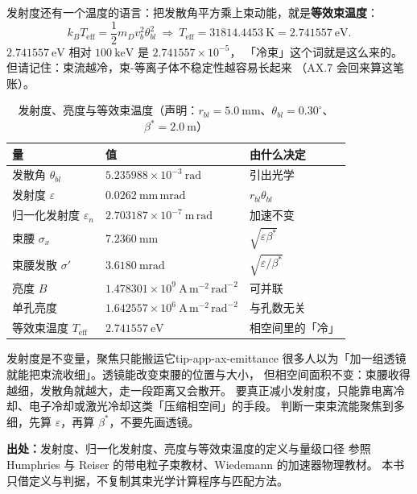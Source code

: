 发射度还有一个温度的语言：把发散角平方乘上束动能，就是\textbf{等效束温度}：
\begin{equation}
k_BT_\mathrm{eff}=\frac{1}{2}m_Dv_b^2\theta_{bl}^2
\ \Longrightarrow\
T_\mathrm{eff}=31814.4453\ \mathrm{K}=2.741557\ \mathrm{eV}.
\label{eq:app-ax-teff}
\end{equation}
$2.741557\ \mathrm{eV}$ 相对 $100\ \mathrm{keV}$ 是 $2.741557\times10^{-5}$，
「冷束」这个词就是这么来的。但请记住：束流越冷，束-等离子体不稳定性越容易长起来
（AX.7 会回来算这笔账）。

\begin{table}[htbp]
\centering
\small
\caption{发射度、亮度与等效束温度（声明：$r_{bl}=5.0\ \mathrm{mm}$、$\theta_{bl}=0.30^\circ$、$\beta^*=2.0\ \mathrm{m}$）}
\label{tab:app-ax-emittance}
\begin{tabular}{p{4.8cm}p{4.4cm}p{4.0cm}}
\hline
量 & 值 & 由什么决定 \\
\hline
发散角 $\theta_{bl}$ & $5.235988\times10^{-3}\ \mathrm{rad}$ & 引出光学 \\
发射度 $\varepsilon$ & $0.0262\ \mathrm{mm\,mrad}$ & $r_{bl}\theta_{bl}$ \\
归一化发射度 $\varepsilon_n$ & $2.703187\times10^{-7}\ \mathrm{m\,rad}$ & 加速不变 \\
束腰 $\sigma_x$ & $7.2360\ \mathrm{mm}$ & $\sqrt{\varepsilon\beta^*}$ \\
束腰发散 $\sigma'$ & $3.6180\ \mathrm{mrad}$ & $\sqrt{\varepsilon/\beta^*}$ \\
亮度 $B$ & $1.478301\times10^{9}\ \mathrm{A\,m^{-2}\,rad^{-2}}$ & 可并联 \\
单孔亮度 & $1.642557\times10^{6}\ \mathrm{A\,m^{-2}\,rad^{-2}}$ & 与孔数无关 \\
等效束温度 $T_\mathrm{eff}$ & $2.741557\ \mathrm{eV}$ & 相空间里的「冷」 \\
\hline
\end{tabular}
\end{table}

\begin{tip}{发射度是不变量，聚焦只能搬运它}{tip-app-ax-emittance}
很多人以为「加一组透镜就能把束流收细」。透镜能改变束腰的位置与大小，
但相空间面积不变：束腰收得越细，发散角就越大，走一段距离又会散开。
要真正减小发射度，只能靠电离冷却、电子冷却或激光冷却这类「压缩相空间」的手段。
判断一束束流能聚焦到多细，先算 $\varepsilon$，再算 $\beta^*$，不要先画透镜。
\end{tip}

{\footnotesize
\textbf{出处：}发射度、归一化发射度、亮度与等效束温度的定义与量级口径
参照 Humphries 与 Reiser 的带电粒子束教材、Wiedemann 的加速器物理教材。
本书只借定义与判据，不复制其束光学计算程序与匹配方法。
}

